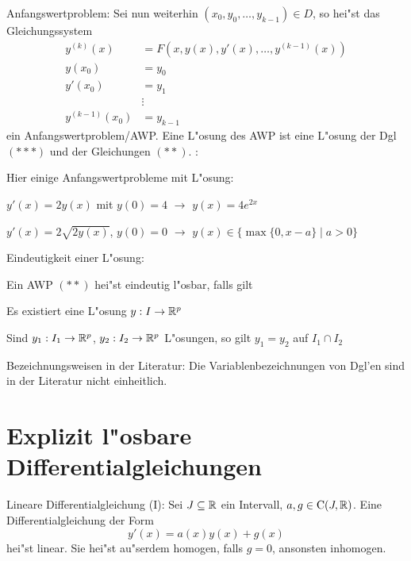  Anfangswertproblem:{
  Sei nun weiterhin $(x_0,y_0,\ldots,y_{k-1})\in D$, so hei"st das 
  Gleichungssystem
  \begin{align*}
    y^{(k)}(x)&=F(x,y(x),y'(x),\ldots,y^{(k-1)}(x)) \tag{***}\\
    y(x_0)&=y_0\\
    y'(x_0)&=y_1 \tag{**} \\
    &\vdots\\
    y^{(k-1)}(x_0)&=y_{k-1} 
    \end{align*}
  ein Anfangswertproblem/AWP. Eine L"osung des AWP ist eine L"osung der
  Dgl $(***)$ und der Gleichungen $(**)$.
  }
\example:{
  Hier einige Anfangswertprobleme mit L"osung:
  \begin{stmts}
    \item $y'(x)=2y(x)$ mit $y(0)=4$ $\to$ $y(x)=4e^{2x}$
    \item $y'(x)=2\sqrt{2y(x)}$, $y(0)=0$ $\to$ 
      $y(x)\in\{\max\{0,x-a\}\mid a>0\}$
    \end{stmts}
  }
 Eindeutigkeit einer L"osung:{
  Ein AWP $(**)$ hei"st eindeutig l"osbar, falls gilt
  \begin{stmts}
    \item Es existiert eine L"osung $y:I\to\mathbb R^p$
    \item Sind $y_1:I_1\to\mathbb R^p$, $y_2:I_2\to\mathbb R^p$ L"osungen, so
      gilt $y_1=y_2$ auf $I_1\cap I_2$
    \end{stmts}
  }
\remark Bezeichnungsweisen in der Literatur:{
  Die Variablenbezeichnungen von Dgl'en sind in der Literatur nicht
  einheitlich.
  }
\section{Explizit l"osbare Differentialgleichungen}
 Lineare Differentialgleichung (I):{
%
%
%
%
%
%
  Sei $J\subseteq\mathbb R$ ein Intervall, $a,g\in{\rm C}(J,\mathbb R)$.
  Eine Differentialgleichung der Form
  \[y'(x)=a(x)y(x)+g(x)
    \]
  hei"st linear. Sie hei"st au"serdem homogen, falls $g=0$, ansonsten 
  inhomogen.
  }

